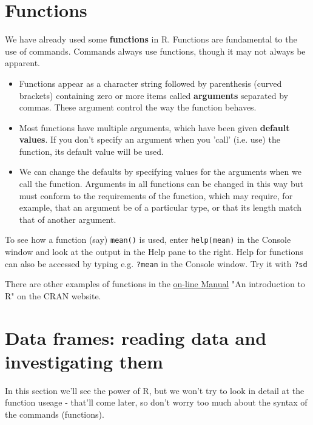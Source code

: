 \documentclass[titlepage]{book}\usepackage{knitr}
\begin{document}
\section{Functions}
We have already used some \textbf{functions} in R.  Functions are fundamental to the use of commands. Commands always use functions, though it may not always be apparent.

\begin{itemize}
\item{Functions appear as a character string followed by parenthesis (curved brackets) containing zero or more items called \textbf{arguments} separated by commas. These argument control the way the function behaves.}

\item{Most functions have multiple  arguments, which have been given \textbf{default values}. If you don't specify an argument when you 'call' (i.e. use) the function, its default value will be used.}

\item{We can change the defaults by specifying values for the arguments when we call the function. Arguments in all functions can be changed in this way but must conform to the requirements of the function, which may require, for example, that an argument be of a particular type, or that its length match that of another argument.}

\end{itemize}

To see how a function (say) \texttt{mean()} is used, enter \texttt{help(mean)} in the Console window and look at the output in the Help pane to the right. Help for functions can also be accessed by typing e.g. \texttt{?mean} in the Console window. Try it with \texttt{?sd}

There are other examples of functions in the \href{https://cran.r-project.org/doc/manuals/r-release/R-intro.html#Simple-examples}{on-line Manual} "An introduction to R" on the CRAN website. 

\section{Data frames: reading data and investigating them}

In this section we'll see the power of R, but we won't try to look in detail at the function useage - that'll come later, so don't worry too much about the syntax of the commands (functions).
\end{document}

